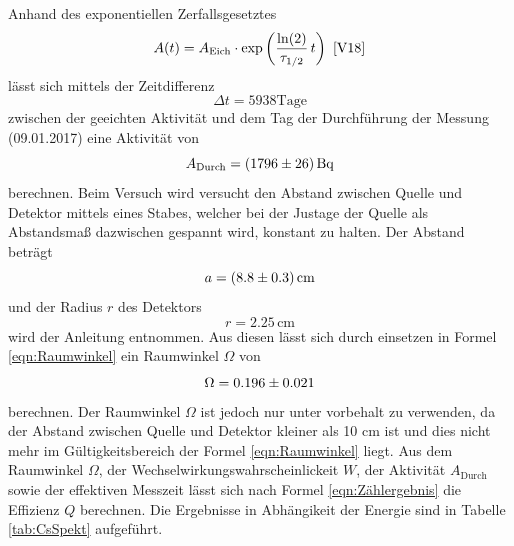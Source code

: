 Anhand des exponentiellen Zerfallsgesetztes 
\begin{equation}
  A(t) = A_\text{Eich} \cdot \exp \left(\frac{\ln(2)}{\tau_{1/2}} \, t \right) \ \text{\cite{V18}}
  \label{eqn:zerfG}
\end{equation}
lässt sich mittels der Zeitdifferenz
\begin{equation}
  \Delta t = 5938 \text{Tage} 
\end{equation}
zwischen der geeichten Aktivität und dem Tag der Durchführung der Messung (09.01.2017) eine Aktivität von
\begin{equation}
  A_\text{Durch} = (\num{1796 +- 26}) \, \text{Bq}
  \label{eqn:AktEEu}
\end{equation}
berechnen. Beim Versuch wird versucht den Abstand zwischen Quelle und Detektor mittels eines Stabes, welcher bei der Justage der Quelle als Abstandsmaß dazwischen gespannt wird, konstant zu halten. Der Abstand beträgt
\begin{equation}
  a = (\num{8.8 +-0.3}) \, \text{cm}
\end{equation}
und der Radius $r$ des Detektors 
\begin{equation}
  r = 2.25 \, \text{cm}
\end{equation}
wird der Anleitung \cite{V18} entnommen. Aus diesen lässt sich durch einsetzen in Formel \ref{eqn:Raumwinkel} ein Raumwinkel $\Omega$ von
\begin{equation}
  \Omega = \num{0.196 +- 0.021}
  \label{eqn:Raum}
\end{equation}
berechnen. Der Raumwinkel $\Omega$ ist jedoch nur unter vorbehalt zu verwenden, da der Abstand zwischen Quelle und Detektor kleiner als 10 cm ist und dies nicht mehr im Gültigkeitsbereich der Formel \ref{eqn:Raumwinkel} liegt. Aus dem Raumwinkel $\Omega$, der Wechselwirkungswahrscheinlickeit $W$, der Aktivität $A_\text{Durch}$ sowie der effektiven Messzeit lässt sich nach Formel \ref{eqn:Zählergebnis} die Effizienz $Q$ berechnen. Die Ergebnisse in Abhängikeit der Energie sind in Tabelle \ref{tab:CsSpekt} aufgeführt. 
